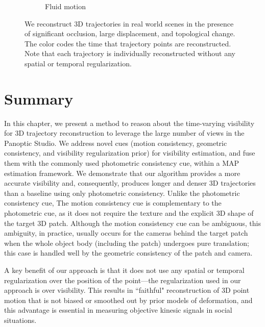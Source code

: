 \begin{figure}[t]
\begin{subfigure}{0.45\textwidth}
			\caption{Fluid motion}
			\label{Fig:fluid_motion}
	\end{subfigure}
	\caption{We reconstruct 3D trajectories in real world scenes in the presence of significant occlusion, large displacement, and topological change. The color codes the time that trajectory points are reconstructed. Note that each trajectory is individually reconstructed without any spatial or temporal regularization.} 
	\label{Fig:qualtitative}
\end{figure}


\section{Summary}
In this chapter, we present a method to reason about the time-varying visibility for 3D trajectory reconstruction to leverage the large number of views in the Panoptic Studio. We address novel cues (motion consistency, geometric consistency, and visibility regularization prior) for visibility estimation, and fuse them with the commonly used photometric consistency cue, within a MAP estimation framework. We demonstrate that our algorithm provides a more accurate visibility and, consequently, produces longer and denser 3D trajectories than a baseline using only photometric consistency. Unlike the photometric consistency cue, The motion consistency cue is complementary to the photometric cue, as it does not require the texture and the explicit 3D shape of the target 3D patch. Although the motion consistency cue can be ambiguous, this ambiguity, in practice, usually occurs for the cameras behind the target patch when the whole object body (including the patch) undergoes pure translation; this case is handled well by the geometric consistency of the patch and camera. 

A key benefit of our approach is that it does not use any spatial or temporal regularization over the position of the point---the regularization used in our approach is over visibility. This results in ``faithful" reconstruction of 3D point motion that is not biased or smoothed out by prior models of deformation, and this advantage is essential in measuring objective kinesic signals in social situations. 


\pagebreak